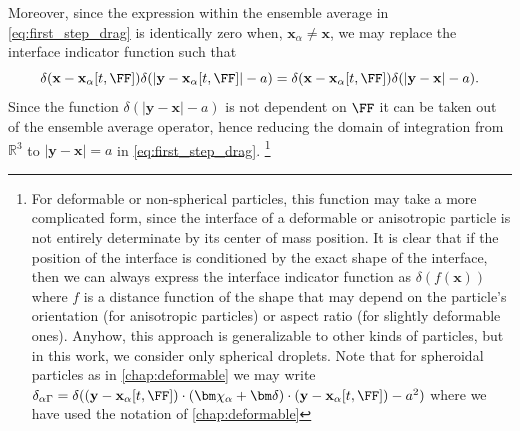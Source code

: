 Moreover, since the expression within the ensemble average in \ref{eq:first_step_drag} is identically zero when, $\textbf{x}_\alpha \neq \textbf{x}$, we may replace the interface indicator function such that 
\begin{equation}
    \delta(\textbf{x}-\textbf{x}_\alpha[t,\FF])\delta(|\textbf{y} - \textbf{x}_{\alpha}[t,\FF]|-a) = \delta(\textbf{x}-\textbf{x}_\alpha[t,\FF])\delta(|\textbf{y} - \textbf{x}|-a). 
    \label{eq:from_R3_to_S}
\end{equation}
Since the function $\delta(|\textbf{y} - \textbf{x}|-a)$ is not dependent on $\FF$ it can be taken out of the ensemble average operator, hence reducing the domain of integration from $\mathbb{R}^3$ to $|\textbf{y}-\textbf{x}| = a$ in \ref{eq:first_step_drag}. 
\footnote{For deformable or non-spherical particles, this function may take a more complicated form, since the interface of a deformable or anisotropic particle is not entirely determinate by its center of mass position. 
It is clear that if the position of the interface is conditioned by the exact shape of the interface, then we can always express the interface indicator function as $\delta(f(\textbf{x}))$ where $f$ is a distance function of the shape that may depend on the particle's orientation (for anisotropic particles) or aspect ratio (for slightly deformable ones). 
Anyhow, this approach is generalizable to other kinds of particles, but in this work, we consider only spherical droplets. 
Note that for spheroidal particles as in \ref{chap:deformable} we may write $\delta_{\alpha\Gamma} = \delta((\textbf{y} - \textbf{x}_\alpha[t,\FF])\cdot (\bm\chi_\alpha+\bm\delta)\cdot(\textbf{y} - \textbf{x}_\alpha[t,\FF]) - a^2)$ where we have used the notation of \ref{chap:deformable}
}

